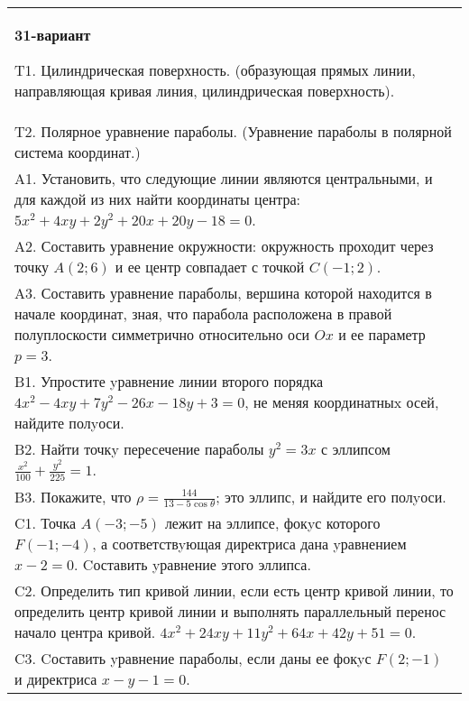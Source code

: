 \documentclass{article}
\begin{document}
\begin{tabular}{m{17cm}}
\textbf{31-вариант}
\newline

T1. Цилиндрическая поверхность. (образующая прямых линии, направляющая кривая линия, цилиндрическая поверхность).\\

T2. Полярное уравнение параболы. (Уравнение параболы в полярной система координат.)\\

A1. Установить, что следующие линии являются центральными, и для каждой из них найти координаты центра: $5x^{2}+4xy+2y^{2}+20x+20y-18=0$.\\

A2. Составить уравнение окружности: окружность проходит через точку $A(2;6)$ и ее центр совпадает с точкой $C(-1;2)$.\\

A3. Составить уравнение параболы, вершина которой находится в начале координат, зная, что парабола расположена в правой полуплоскости симметрично относительно оси $Ox$ и ее параметр $p=3$.\\

B1. Упростите yравнение линии второго порядка $4x^{2} - 4xy + 7y^{2} - 26x - 18y + 3 = 0$, не меняя координатныx осей, найдите полyоси.\\

B2. Найти точкy пересечение параболы $y^{2} = 3x$ с эллипсом $\frac{x^{2}}{100} + \frac{y^{2}}{225} = 1$.  \\

B3. Покажите, что $\rho = \frac{144}{13 - 5\cos\theta}$; это эллипс, и найдите его полyоси.\\

C1. Точка $A(-3;-5)$ лежит на эллипсе, фокyс которого $F(-1;-4)$, а соответствyющая директриса дана yравнением $x-2=0$. Cоставить yравнение этого эллипса.  \\

C2. Определить тип кривой линии, если есть центр кривой линии, то определить центр кривой линии и выполнять параллельный перенос начало центра кривой. $4x^{2}+24xy+11y^{2}+64x+42y+51=0$.  \\

C3. Cоставить yравнение параболы, если даны ее фокyс $F(2;-1)$ и директриса $x-y-1=0$.  \\

\end{tabular}
\vspace{1cm}
\end{document}
